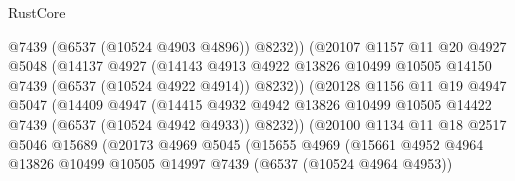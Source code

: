 \begin{lexlean}{RustCore}
\begin{coremodule}
                                  @7439
                                  (@6537 (@10524 @4903 @4896))
                                  @8232))
                              (@20107
                                @1157
                                @11
                                @20
                                @4927
                                @5048
                                (@14137
                                  @4927
                                  (@14143
                                    @4913
                                    @4922
                                    @13826
                                    @10499
                                    @10505
                                    @14150
                                    @7439
                                    (@6537 (@10524 @4922 @4914))
                                    @8232))
                                (@20128
                                  @1156
                                  @11
                                  @19
                                  @4947
                                  @5047
                                  (@14409
                                    @4947
                                    (@14415
                                      @4932
                                      @4942
                                      @13826
                                      @10499
                                      @10505
                                      @14422
                                      @7439
                                      (@6537 (@10524 @4942 @4933))
                                      @8232))
                                  (@20100
                                    @1134
                                    @11
                                    @18
                                    @2517
                                    @5046
                                    @15689
                                    (@20173
                                      @4969
                                      @5045
                                      (@15655
                                        @4969
                                        (@15661
                                          @4952
                                          @4964
                                          @13826
                                          @10499
                                          @10505
                                          @14997
                                          @7439
                                          (@6537 (@10524 @4964 @4953))

\end{coremodule}
\end{lexlean}
